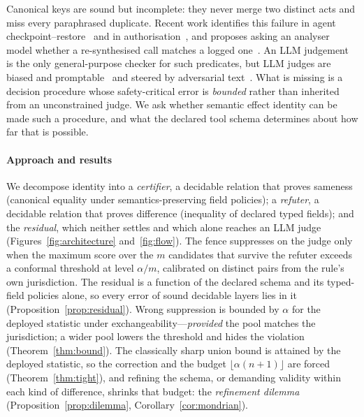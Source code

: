Canonical keys are sound but incomplete: they never merge two distinct acts and miss every paraphrased duplicate. Recent work identifies this failure in agent checkpoint--restore~\cite{zheng2026acrfence} and in authorisation~\cite{xu2026caplease}, and proposes asking an analyser model whether a re-synthesised call matches a logged one~\cite{zheng2026acrfence}. An LLM judgement is the only general-purpose checker for such predicates, but LLM judges are biased and promptable~\cite{zheng2023judge,wang2023fair,ye2024justice} and steered by adversarial text~\cite{greshake2023injection,hwang2025persuasion}. What is missing is a decision procedure whose safety-critical error is \emph{bounded} rather than inherited from an unconstrained judge. We ask whether semantic effect identity can be made such a procedure, and what the declared tool schema determines about how far that is possible.

\paragraph{Approach and results}
We decompose identity into a \emph{certifier}, a decidable relation that proves sameness (canonical equality under semantics-preserving field policies); a \emph{refuter}, a decidable relation that proves difference (inequality of declared typed fields); and the \emph{residual}, which neither settles and which alone reaches an LLM judge (Figures~\ref{fig:architecture} and~\ref{fig:flow}). The fence suppresses on the judge only when the maximum score over the $m$ candidates that survive the refuter exceeds a conformal threshold at level $\alpha/m$, calibrated on distinct pairs from the rule's own jurisdiction. The residual is a function of the declared schema and its typed-field policies alone, so every error of sound decidable layers lies in it (Proposition~\ref{prop:residual}). Wrong suppression is bounded by $\alpha$ for the deployed statistic under exchangeability---\emph{provided} the pool matches the jurisdiction; a wider pool lowers the threshold and hides the violation (Theorem~\ref{thm:bound}). The classically sharp union bound is attained by the deployed statistic, so the correction and the budget $\lfloor\alpha(n+1)\rfloor$ are forced (Theorem~\ref{thm:tight}), and refining the schema, or demanding validity within each kind of difference, shrinks that budget: the \emph{refinement dilemma} (Proposition~\ref{prop:dilemma}, Corollary~\ref{cor:mondrian}).

